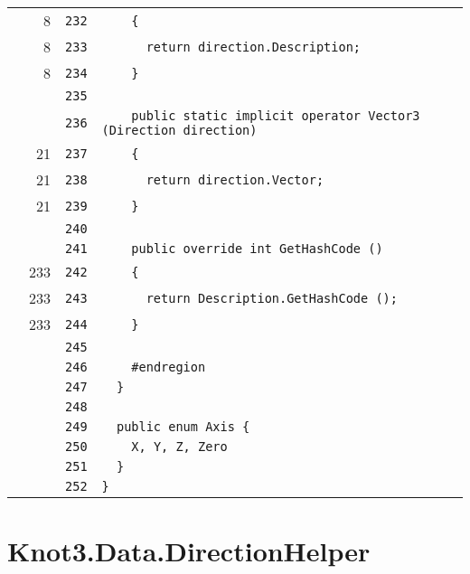 \documentclass[a4paper,10pt]{article}
\begin{document}
\begin{longtable}[l]{lrrl}
\cellcolor{green} & 8 & \verb~232~ & \verb~    {~\\
\cellcolor{green} & 8 & \verb~233~ & \verb~      return direction.Description;~\\
\cellcolor{green} & 8 & \verb~234~ & \verb~    }~\\
\cellcolor{gray} &  & \verb~235~ & \verb~~\\
\cellcolor{gray} &  & \verb~236~ & \verb~    public static implicit operator Vector3 (Direction direction)~\\
\cellcolor{green} & 21 & \verb~237~ & \verb~    {~\\
\cellcolor{green} & 21 & \verb~238~ & \verb~      return direction.Vector;~\\
\cellcolor{green} & 21 & \verb~239~ & \verb~    }~\\
\cellcolor{gray} &  & \verb~240~ & \verb~~\\
\cellcolor{gray} &  & \verb~241~ & \verb~    public override int GetHashCode ()~\\
\cellcolor{green} & 233 & \verb~242~ & \verb~    {~\\
\cellcolor{green} & 233 & \verb~243~ & \verb~      return Description.GetHashCode ();~\\
\cellcolor{green} & 233 & \verb~244~ & \verb~    }~\\
\cellcolor{gray} &  & \verb~245~ & \verb~~\\
\cellcolor{gray} &  & \verb~246~ & \verb~    #endregion~\\
\cellcolor{gray} &  & \verb~247~ & \verb~  }~\\
\cellcolor{gray} &  & \verb~248~ & \verb~~\\
\cellcolor{gray} &  & \verb~249~ & \verb~  public enum Axis {~\\
\cellcolor{gray} &  & \verb~250~ & \verb~    X, Y, Z, Zero~\\
\cellcolor{gray} &  & \verb~251~ & \verb~  }~\\
\cellcolor{gray} &  & \verb~252~ & \verb~}~\\
\end{longtable}
\newpage
\section{Knot3.Data.DirectionHelper}
\end{document}
